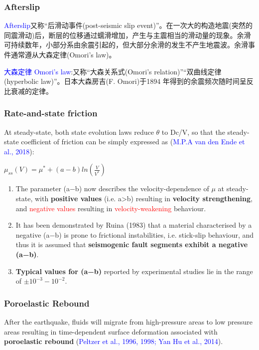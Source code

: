 ﻿\documentclass{beamer}
\begin{document}
\begin{frame}
\frametitle{Afterslip}
\textcolor{blue}{Afterslip}又称“后滑动事件(post-seismic slip event)”。在一次大的构造地震(突然的同震滑动)后，断层的位移通过蠕滑增加，产生与主震相当的滑动量的现象。余滑可持续数年，小部分系由余震引起的，但大部分余滑的发生不产生地震波。余滑事件通常遵从大森定律(Omori's law)。

\textcolor{blue}{大森定律 Omori’s law}:又称“大森关系式(Omori's relation)”“双曲线定律(hyperbolic law)”。日本大森房吉(F. Omori)于1894 年得到的余震频次随时间呈反比衰减的定律。
\end{frame}

\begin{frame}
\frametitle{Rate-and-state friction}
At steady-state, both state evolution laws reduce $\theta$ to Dc/V, so that the steady-state coefficient of friction can be simply expressed as (\textcolor{blue}{M.P.A van den Ende et al., 2018}):

$\mu_{ss}(V)=\mu^{*}+(a-b)ln(\frac{V}{V^*})$
\\

\tiny{
\begin{enumerate}
  \item The parameter (a−b) now describes the velocity-dependence of $\mu$ at steady-state, with \textbf{positive values} (i.e. a>b) resulting in \textbf{velocity strengthening}, and \textcolor{red}{negative values} resulting in \textcolor{red}{velocity-weakening} behaviour.
  \item It has been demonstrated by Ruina (1983) that a material characterised by a negative (a−b) is prone to frictional instabilities, i.e. stick-slip behaviour, and thus it is assumed that \textbf{seismogenic fault segments exhibit a negative (a−b)}.
  \item \textbf{Typical values for (a−b)} reported by experimental studies lie in the range of $\pm 10^{-3}-10^{-2}$.
\end{enumerate}
}
\end{frame}

\begin{frame}
\frametitle{Poroelastic Rebound}
After the earthquake, fluids will migrate from high-pressure areas to low pressure
areas resulting in time-dependent surface deformation associated with\textbf{ poroelastic rebound} (\textcolor{blue}{Peltzer et al., 1996, 1998; Yan Hu et al., 2014}).
\end{frame}
\end{document}
